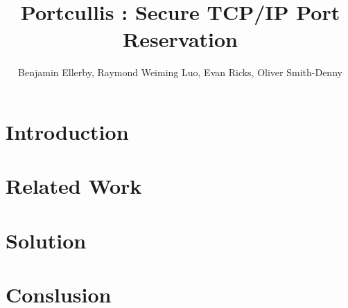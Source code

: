 \documentclass{sig-alternate}
\title{Portcullis : Secure TCP/IP Port Reservation}
\author{Benjamin Ellerby, Raymond Weiming Luo, Evan Ricks, Oliver Smith-Denny}
\begin{document}
\maketitle
\thispagestyle{firstpage}
\pagestyle{plain}

\begin{abstract}

\end{abstract}

\section{Introduction}

\section{Related Work}

\section{Solution}

\section{Conslusion}




\end{document}
